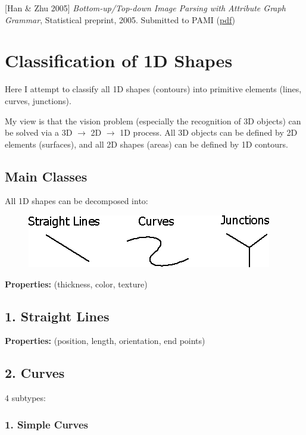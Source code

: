 [Han \& Zhu 2005] \emph{Bottom-up/Top-down Image Parsing with Attribute Graph Grammar}, 
Statistical preprint, 2005. Submitted to PAMI (\href{http://www.stat.ucla.edu/~sczhu/papers/PAMI_Grammar_rectangle.pdf}{pdf}) 

\section{Classification of 1D Shapes}

Here I attempt to classify all 1D shapes (contours) into primitive elements (lines, curves, junctions).

My view is that the vision problem (especially the recognition of 3D objects) can be solved via a 3D $\rightarrow$ 2D  $\rightarrow$ 1D process. All  3D objects can be defined by 2D elements (surfaces), and all 2D shapes (areas) can be defined by 1D contours.

\subsection{Main Classes}

All 1D shapes can be decomposed into: 

\begin{figure}[H]
\centering
\includegraphics[scale=0.7]{1DClasses.PNG}
\end{figure}

\textbf{Properties:} (thickness, color, texture)

\subsection{1. Straight Lines}

\textbf{Properties:} (position, length, orientation, end points)

\subsection{2. Curves}

4 subtypes:

\subsubsection{1. Simple Curves}

